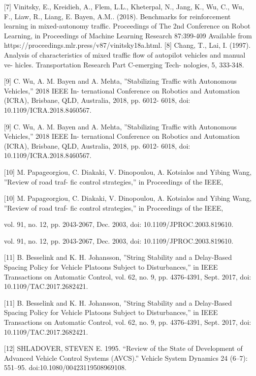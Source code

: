 \documentclass[12pt]{article}
\begin{document}
[7] Vinitsky, E., Kreidieh, A., Flem, L.L., Kheterpal,
N., Jang, K., Wu, C., Wu, F., Liaw, R., Liang, E.
Bayen, A.M.. (2018). Benchmarks for reinforcement
learning in mixed-autonomy traffic. Proceedings of The
2nd Conference on Robot Learning, in Proceedings of
Machine Learning Research 87:399-409 Available from
https://proceedings.mlr.press/v87/vinitsky18a.html.
[8] Chang, T., Lai, I. (1997). Analysis of characteristics of
mixed traffic flow of autopilot vehicles and manual ve-
hicles. Transportation Research Part C-emerging Tech-
nologies, 5, 333-348.


[9] C. Wu, A. M. Bayen and A. Mehta, ”Stabilizing
Traffic with Autonomous Vehicles,” 2018 IEEE In-
ternational Conference on Robotics and Automation
(ICRA), Brisbane, QLD, Australia, 2018, pp. 6012-
6018, doi: 10.1109/ICRA.2018.8460567.


[9] C. Wu, A. M. Bayen and A. Mehta, ”Stabilizing
Traffic with Autonomous Vehicles,” 2018 IEEE In-
ternational Conference on Robotics and Automation
(ICRA), Brisbane, QLD, Australia, 2018, pp. 6012-
6018, doi: 10.1109/ICRA.2018.8460567.


[10] M. Papageorgiou, C. Diakaki, V. Dinopoulou, A.
Kotsialos and Yibing Wang, ”Review of road traf-
fic control strategies,” in Proceedings of the IEEE,


[10] M. Papageorgiou, C. Diakaki, V. Dinopoulou, A.
Kotsialos and Yibing Wang, ”Review of road traf-
fic control strategies,” in Proceedings of the IEEE,


vol. 91, no. 12, pp. 2043-2067, Dec. 2003, doi:
10.1109/JPROC.2003.819610.


vol. 91, no. 12, pp. 2043-2067, Dec. 2003, doi:
10.1109/JPROC.2003.819610.


[11] B. Besselink and K. H. Johansson, ”String Stability
and a Delay-Based Spacing Policy for Vehicle Platoons
Subject to Disturbances,” in IEEE Transactions on
Automatic Control, vol. 62, no. 9, pp. 4376-4391, Sept.
2017, doi: 10.1109/TAC.2017.2682421.


[11] B. Besselink and K. H. Johansson, ”String Stability
and a Delay-Based Spacing Policy for Vehicle Platoons
Subject to Disturbances,” in IEEE Transactions on
Automatic Control, vol. 62, no. 9, pp. 4376-4391, Sept.
2017, doi: 10.1109/TAC.2017.2682421.


[12] SHLADOVER, STEVEN E. 1995. “Review of the State
of Development of Advanced Vehicle Control Systems
(AVCS).” Vehicle System Dynamics 24 (6–7): 551–95.
doi:10.1080/00423119508969108.
\end{document}
